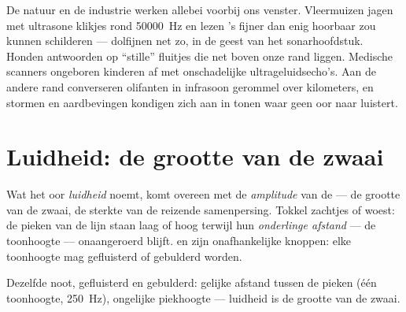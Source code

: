 \begin{example}\label{ex:g8:sound-pitch-loudness:beyond}
De natuur en de industrie werken allebei voorbij ons venster.
Vleermuizen jagen met ultrasone klikjes rond \qty{50000}{Hz} en lezen
's fijner dan enig hoorbaar  zou kunnen
schilderen --- dolfijnen net zo, in de geest van het sonarhoofdstuk.
Honden antwoorden op ``stille'' fluitjes die net boven onze rand
liggen. Medische scanners  ongeboren kinderen af met
onschadelijke ultrageluidsecho's. Aan de andere rand converseren
olifanten in infrasoon gerommel over kilometers, en stormen en
aardbevingen kondigen zich aan in tonen waar geen oor naar luistert.
\end{example}

\section{Luidheid: de grootte van de zwaai}

\begin{proposition}\label{prop:g8:sound-pitch-loudness:loudness}
Wat het oor \emph{luidheid} noemt, komt overeen met de
\emph{amplitude} van de  --- de grootte
van de zwaai, de sterkte van de reizende samenpersing. Tokkel zachtjes
of woest: de pieken van de lijn staan laag of hoog terwijl hun
\emph{onderlinge afstand} --- de toonhoogte --- onaangeroerd blijft.
 en  zijn onafhankelijke knoppen:
elke toonhoogte mag gefluisterd of gebulderd worden.
\end{proposition}

\begin{omfigure}

{\small Dezelfde noot, gefluisterd en gebulderd: gelijke afstand tussen
de pieken (één toonhoogte, \qty{250}{Hz}), ongelijke piekhoogte ---
luidheid is de grootte van de zwaai.}
\end{omfigure}

